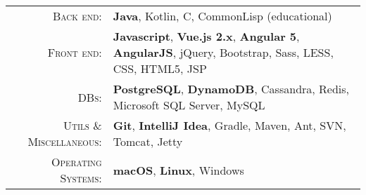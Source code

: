 %
%
%

\renewcommand{\arraystretch}{1.1}

	\begin{tabular}{>{}r>{}p{13cm}} 
		\textsc{Back end:} &
			\textbf{Java}, Kotlin, C, CommonLisp (educational) \\
		\textsc{Front end:} &
			\textbf{Javascript}, \textbf{Vue.js 2.x}, \textbf{Angular 5}, \textbf{AngularJS}, jQuery, Bootstrap, Sass, LESS, CSS, HTML5, JSP \\ 
		\textsc{DBs:} & 
			\textbf{PostgreSQL}, \textbf{DynamoDB}, Cassandra, Redis, Microsoft SQL Server, MySQL \\ 
		\textsc{Utils \& Miscellaneous:} &
			\textbf{Git}, \textbf{IntelliJ Idea}, Gradle, Maven, Ant, SVN, Tomcat, Jetty \\
		\textsc{Operating Systems:} &
			\textbf{macOS}, \textbf{Linux}, Windows \\ 
	\end{tabular}

